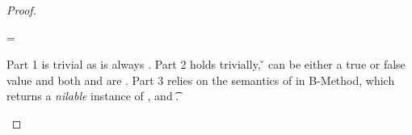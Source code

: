 \begin{lemma}
\begin{enumerate}
\begin{proof}
\begin{case}[T-MethodStatic]
  \e{} = { 
                          {} 
                          {}
                          {\mth{}} {\e{}} {}}

Part 1 is trivial as \object{} is always \emptyobject{}.
Part 2 holds trivially, \v{} can be either a true or false value
and both {\thenprop{\prop{}}} and {\elseprop{\prop{}}}
are \topprop{}.
Part 3 relies on the semantics of \invokejavamethodliteral 
in B-Method, which returns a \emph{nilable} instance of ,
and  {\t{}}.

\end{case}

\end{proof}

\end{enumerate}
\end{lemma}
